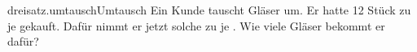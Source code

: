 \begin{exercise}{dreisatz.umtausch}{Umtausch}
  \ifproblem\problem
    Ein Kunde tauscht Gläser um. Er hatte 12 Stück zu je  gekauft. Dafür
    nimmt er jetzt solche zu je . Wie viele Gläser bekommt er dafür?
  \fi
\end{exercise}
